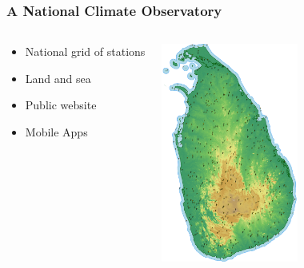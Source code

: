 \documentclass[serif,mathserif]{beamer}
\begin{document}
\begin{frame}
  \frametitle{A National Climate Observatory}
\begin{columns}
\begin{center}
\begin{itemize}
 \item National grid of stations
 \item Land and sea
 \item Public website
 \item Mobile Apps
\end{itemize}
\end{center}

\begin{center}
 \includegraphics[width=4.5cm]{ws500.png}
\end{center}
\end{columns}
\end{frame}

\end{document}
